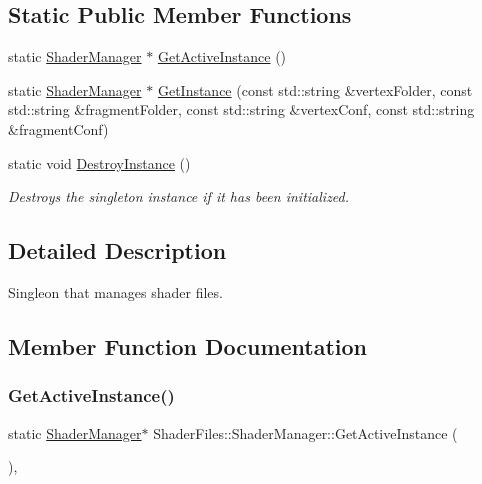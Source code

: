 \subsection*{Static Public Member Functions}
\begin{DoxyCompactItemize}
\item 
static \mbox{\hyperlink{class_shader_files_1_1_shader_manager}{Shader\+Manager}} $\ast$ \mbox{\hyperlink{class_shader_files_1_1_shader_manager_a968056a24117c1f7ff3bed5fc1384e83}{Get\+Active\+Instance}} ()
\item 
static \mbox{\hyperlink{class_shader_files_1_1_shader_manager}{Shader\+Manager}} $\ast$ \mbox{\hyperlink{class_shader_files_1_1_shader_manager_a805da1d794532dd7dbc148795ec54d28}{Get\+Instance}} (const std\+::string \&vertex\+Folder, const std\+::string \&fragment\+Folder, const std\+::string \&vertex\+Conf, const std\+::string \&fragment\+Conf)
\item 
\mbox{\label{class_shader_files_1_1_shader_manager_a910fddbe61fae50a7bf956d4d5c2a813}} 
static void \mbox{\hyperlink{class_shader_files_1_1_shader_manager_a910fddbe61fae50a7bf956d4d5c2a813}{Destroy\+Instance}} ()
\begin{DoxyCompactList}\small\item\em Destroys the singleton instance if it has been initialized. \end{DoxyCompactList}\end{DoxyCompactItemize}


\subsection{Detailed Description}
Singleon that manages shader files. 

\subsection{Member Function Documentation}
\mbox{\label{class_shader_files_1_1_shader_manager_a968056a24117c1f7ff3bed5fc1384e83}} 
\subsubsection{\texorpdfstring{GetActiveInstance()}{GetActiveInstance()}}
{\footnotesize\ttfamily static \mbox{\hyperlink{class_shader_files_1_1_shader_manager}{Shader\+Manager}}$\ast$ Shader\+Files\+::\+Shader\+Manager\+::\+Get\+Active\+Instance (\begin{DoxyParamCaption}{ }\end{DoxyParamCaption})\hspace{0.3cm}{\ttfamily [inline]}, {\ttfamily [static]}}

